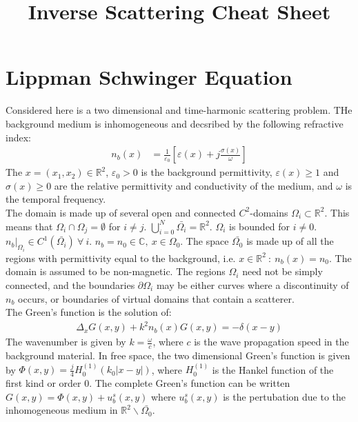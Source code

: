 \documentclass[14pt]{article}
\title{Inverse Scattering Cheat Sheet}
\begin{document}
	\maketitle
	
	\section{Lippman Schwinger Equation}
		Considered here is a two dimensional and time-harmonic scattering problem.
	THe background medium is inhomogeneous and decsribed by the following refractive
	index:	
		\begin{align}
			n_b(x) &= \frac{1}{\varepsilon_0}[\varepsilon(x) + j\frac{\sigma(x)}{\omega}]
		\end{align}
	The $x = (x_1,x_2) \in \mathbb{R}^2$, $\varepsilon_0 > 0$ is the background
	permittivity, $\varepsilon(x) \ge 1$ and $\sigma(x) \ge 0$ are the relative
	permittivity and conductivity of the medium, and $\omega$ is the temporal
	frequency.~\\
	
		The domain is made up of several open and connected $C^2$-domains $\Omega_i \subset \mathbb{R}^2$.
	This means that $\Omega_i \cap \Omega_j = \emptyset$ for $i \ne j$.  
	$\bigcup_{i=0}^N \bar{\Omega_i} = \mathbb{R}^2$.  $\Omega_i$ is bounded for $i \ne 0$.
	$n_b|_{\Omega_i} \in C^1(\bar{\Omega_i})~\forall~i$.  $n_b = n_0 \in \mathbb{C},
	~x \in \Omega_0$.  The space $\bar{\Omega_0}$ is made up of all the regions with
	permittivity equal to the background, i.e. $x \in \mathbb{R}^2~:~n_b(x) = n_0$.
	The domain is assumed to be non-magnetic.  The regions $\Omega_i$ need not be
	simply connected, and the boundaries $\partial \Omega_i$ may be either curves
	where a discontinuity of $n_b$ occurs, or boundaries of virtual domains that
	contain a scatterer.~\\	

		The Green's function is the solution of:
			\begin{align}
				\Delta_x G(x,y) + k^2n_b(x)G(x,y) = -\delta(x - y)
			\end{align}
	The wavenumber is given by $k = \frac{\omega}{c}$, where $c$ is the wave
	propagation speed in the background material.  In free space, the two dimensional
	Green's function is given by $\Phi(x,y) = \frac{j}{4}H_0^{(1)}(k_0|x - y|)$, 
	where $H_0^{(1)}$ is the Hankel function of the first kind or order 0.  The
	complete Green's function can be written $G(x,y) = \Phi(x,y) + u_b^s(x,y)$ 
	where $u_b^s(x,y)$ is the pertubation due to the inhomogeneous medium in
	$\mathbb{R}^2 \backslash \bar{\Omega_0}$.
\end{document}
